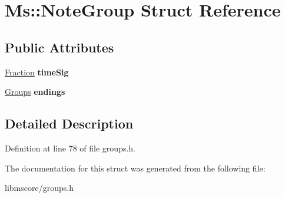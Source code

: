 \hypertarget{struct_ms_1_1_note_group}{}\section{Ms\+:\+:Note\+Group Struct Reference}
\label{struct_ms_1_1_note_group}
\subsection*{Public Attributes}
\begin{DoxyCompactItemize}
\item 
\mbox{\label{struct_ms_1_1_note_group_aeedd9235f47a4d976775cc44e0094c52}} 
\hyperlink{class_ms_1_1_fraction}{Fraction} {\bfseries time\+Sig}
\item 
\mbox{\label{struct_ms_1_1_note_group_aafde46e839ea0e849a0957592dbbdd7a}} 
\hyperlink{class_ms_1_1_groups}{Groups} {\bfseries endings}
\end{DoxyCompactItemize}


\subsection{Detailed Description}


Definition at line 78 of file groups.\+h.



The documentation for this struct was generated from the following file\+:\begin{DoxyCompactItemize}
\item 
libmscore/groups.\+h\end{DoxyCompactItemize}
